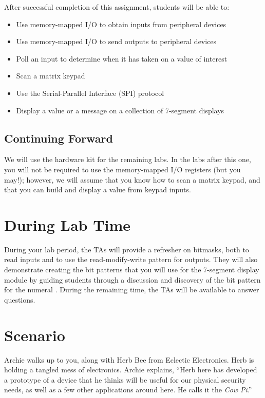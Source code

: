 After successful completion of this assignment, students will be able to:
\begin{itemize}
\item Use memory-mapped I/O to obtain inputs from peripheral devices
\item Use memory-mapped I/O to send outputs to peripheral devices
\item Poll an input to determine when it has taken on a value of interest
\item Scan a matrix keypad
\item Use the Serial-Parallel Interface (SPI) protocol
\item Display a value or a message on a collection of 7-segment displays
\end{itemize}

\subsection*{Continuing Forward}

We will use the hardware kit for the remaining labs. In the labs after this one,
you will not be required to use the memory-mapped I/O registers (but you may!);
however, we will assume that you know how to scan a matrix keypad, and that you
can build and display a value from keypad inputs.

\section*{During Lab Time}

During your lab period, the TAs will provide a refresher on bitmasks, both to
read inputs and to use the read-modify-write pattern for outputs. They will also
demonstrate creating the bit patterns that you will use for the 7-segment
display module by guiding students through a discussion and discovery of the
bit pattern for the numeral {}. During the remaining time, the TAs
will be available to answer questions.

\softwareengineeringfrontmatter

\section{Scenario}

Archie walks up to you, along with Herb Bee from Eclectic Electronics. Herb is
holding a tangled mess of electronics. Archie explains, ``Herb here has
developed a prototype of a device that he thinks will be useful for our
physical security needs, as well as a few other applications around here. He
calls it the \textit{Cow Pi}.''

